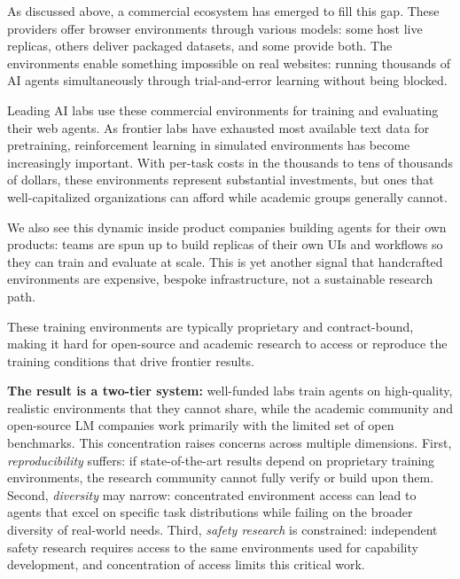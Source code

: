 \documentclass[letterpaper]{article}
\begin{document}
As discussed above, a commercial ecosystem has emerged to fill this gap. These providers offer browser environments through various models: some host live replicas, others deliver packaged datasets, and some provide both. The environments enable something impossible on real websites: running thousands of AI agents simultaneously through trial-and-error learning without being blocked.

Leading AI labs use these commercial environments for training and evaluating their web agents. As frontier labs have exhausted most available text data for pretraining, reinforcement learning in simulated environments has become increasingly important. With per-task costs in the thousands to tens of thousands of dollars, these environments represent substantial investments, but ones that well-capitalized organizations can afford while academic groups generally cannot.

We also see this dynamic inside product companies building agents for their own products: teams are spun up to build replicas of their own UIs and workflows so they can train and evaluate at scale. This is yet another signal that handcrafted environments are expensive, bespoke infrastructure, not a sustainable research path.

These training environments are typically proprietary and contract-bound, making it hard for open-source and academic research to access or reproduce the training conditions that drive frontier results.

\textbf{The result is a two-tier system:} well-funded labs train agents on high-quality, realistic environments that they cannot share, while the academic community and open-source LM companies work primarily with the limited set of open benchmarks. This concentration raises concerns across multiple dimensions. First, \emph{reproducibility} suffers: if state-of-the-art results depend on proprietary training environments, the research community cannot fully verify or build upon them. Second, \emph{diversity} may narrow: concentrated environment access can lead to agents that excel on specific task distributions while failing on the broader diversity of real-world needs. Third, \emph{safety research} is constrained: independent safety research requires access to the same environments used for capability development, and concentration of access limits this critical work.

\end{document}
